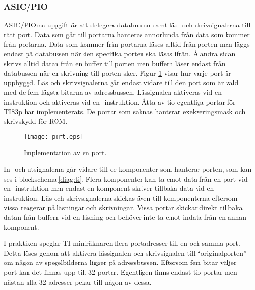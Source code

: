 \documentclass[main.tex]{subfiles}
\begin{document}
\subsubsection{ASIC/PIO}
ASIC/PIO:ns uppgift är att delegera databussen samt läs- och skrivsignalerna
till rätt port. Data som går till portarna hanteras annorlunda från data som
kommer från portarna. Data som kommer från portarna läses alltid från porten
men läggs endast på databussen när den specifika porten ska läsas ifrån. Å
andra sidan skrivs alltid datan från en buffer till porten men buffern läser
endast från databussen när en skrivning till porten sker. Figur \ref{fig:port}
visar hur varje port är uppbyggd. Läs och skrivsignalerna går endast vidare
till den port som är vald med de fem lägsta bitarna av adressbussen.
Lässignalen  aktiveras vid en -instruktion och 
aktiveras vid en -instruktion. Åtta av tio egentliga portar för TI83p
har implementerats. De portar som saknas hanterar exekveringsmask och
skrivskydd för ROM.

\begin{figure}[H]
    \center
    \texttt{[image: port.eps]}
    \caption{Implementation av en port.}
    \label{fig:port}
\end{figure}

In- och utsignalerna går vidare till de komponenter som hanterar porten, som
kan ses i blockschema \ref{diag:ti}. Flera komponenter kan ta emot data från en
port vid en -instruktion men endast en komponent skriver tillbaka
data vid en -instruktion. Läs och skrivsignalerna skickas även till
komponenterna eftersom vissa reagerar på läsningar och skrivningar. Vissa
portar skickar direkt tillbaka datan från buffern vid en läsning och behöver
inte ta emot indata från en annan komponent.

I praktiken speglar TI-miniräknaren flera portadresser till en och samma port.
Detta löses genom att aktivera lässignalen och skrivsignalen till
``originalporten'' om någon av spegelbilderna ligger på adressbussen. Eftersom
fem bitar väljer port kan det finnas upp till 32 portar. Egentligen finns
endast tio portar men nästan alla 32 adresser pekar till någon av dessa.
\end{document}
